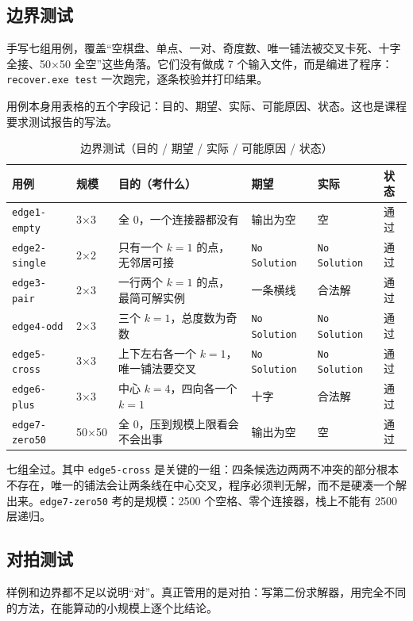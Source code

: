 \documentclass[12pt,a4paper,fontset=windows]{ctexart}
\newcommand{\code}[1]{\texttt{#1}}
\begin{document}
\subsection{边界测试}

手写七组用例，覆盖“空棋盘、单点、一对、奇度数、唯一铺法被交叉卡死、十字全接、50×50 全空”这些角落。它们没有做成 7 个输入文件，而是编进了程序：\code{recover.exe test} 一次跑完，逐条校验并打印结果。

用例本身用表格的五个字段记：目的、期望、实际、可能原因、状态。这也是课程要求测试报告的写法。

\begin{table}[htbp]
\centering
\caption{边界测试（目的 / 期望 / 实际 / 可能原因 / 状态）}
\label{tab:edge}
\footnotesize
\begin{tabular}{p{2.4cm}p{1.4cm}p{3.4cm}p{2.6cm}p{2.4cm}p{1.1cm}}
\toprule
\rowcolor{gray!12}用例 & 规模 & 目的（考什么） & 期望 & 实际 & 状态 \\
\midrule
\code{edge1-empty} & 3×3 & 全 0，一个连接器都没有 & 输出为空 & 空 & 通过 \\
\code{edge2-single} & 2×2 & 只有一个 $k=1$ 的点，无邻居可接 & \code{No Solution} & \code{No Solution} & 通过 \\
\code{edge3-pair} & 2×3 & 一行两个 $k=1$ 的点，最简可解实例 & 一条横线 & 合法解 & 通过 \\
\code{edge4-odd} & 2×3 & 三个 $k=1$，总度数为奇数 & \code{No Solution} & \code{No Solution} & 通过 \\
\code{edge5-cross} & 3×3 & 上下左右各一个 $k=1$，唯一铺法要交叉 & \code{No Solution} & \code{No Solution} & 通过 \\
\code{edge6-plus} & 3×3 & 中心 $k=4$，四向各一个 $k=1$ & 十字 & 合法解 & 通过 \\
\code{edge7-zero50} & 50×50 & 全 0，压到规模上限看会不会出事 & 输出为空 & 空 & 通过 \\
\bottomrule
\end{tabular}
\end{table}

七组全过。其中 \code{edge5-cross} 是关键的一组：四条候选边两两不冲突的部分根本不存在，唯一的铺法会让两条线在中心交叉，程序必须判无解，而不是硬凑一个解出来。\code{edge7-zero50} 考的是规模：2500 个空格、零个连接器，栈上不能有 2500 层递归。

\subsection{对拍测试}

样例和边界都不足以说明“对”。真正管用的是对拍：写第二份求解器，用完全不同的方法，在能算动的小规模上逐个比结论。
\end{document}
